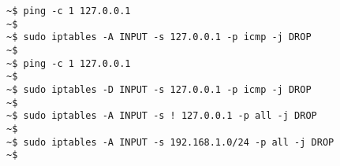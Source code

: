 \documentclass[varwidth=35em]{standalone}
\begin{document}
\begin{verbatim}
~$ ping -c 1 127.0.0.1
~$ 
~$ sudo iptables -A INPUT -s 127.0.0.1 -p icmp -j DROP
~$
~$ ping -c 1 127.0.0.1
~$ 
~$ sudo iptables -D INPUT -s 127.0.0.1 -p icmp -j DROP
~$
~$ sudo iptables -A INPUT -s ! 127.0.0.1 -p all -j DROP
~$
~$ sudo iptables -A INPUT -s 192.168.1.0/24 -p all -j DROP
~$
\end{verbatim}
\end{document}

